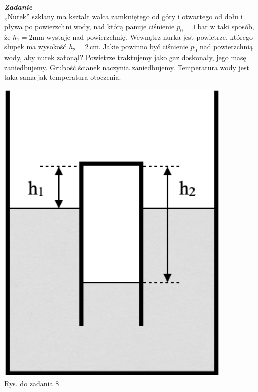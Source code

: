 \documentclass[11pt,a4paper]{article}
\newcounter{zadanie}\newcommand{\zadanie}[1][]{\addtocounter{zadanie}{1} ~\\  {\bf \emph{Zadanie \arabic{zadanie} #1 }} \\}
\begin{document}
\begin{minipage}{0.75\textwidth}
\zadanie
„Nurek” szklany ma kształt walca zamkniętego od góry i otwartego od dołu i pływa po powierzchni wody, nad którą panuje ciśnienie $p_0 = 1\,\textrm{bar}$ w taki sposób, że $h_1 = 2\textrm{mm}$ wystaje nad powierzchnię. Wewnątrz nurka jest powietrze, którego słupek ma wysokość $h_2 = 2\,\textrm{cm}$.
Jakie powinno być ciśnienie $p_0$ nad powierzchnią wody, aby nurek zatonął? Powietrze traktujemy jako gaz doskonały, jego masę zaniedbujemy. Grubość ścianek naczynia zaniedbujemy. Temperatura wody jest taka sama jak temperatura otoczenia.
\phantom{.} \\
\end{minipage}
\begin{minipage}{0.25\textwidth}
\begin{center}

\includegraphics[width=0.85\textwidth]{zadanie8.png}\\
Rys. do zadania 8
\end{center}
\end{minipage}
\end{document}
